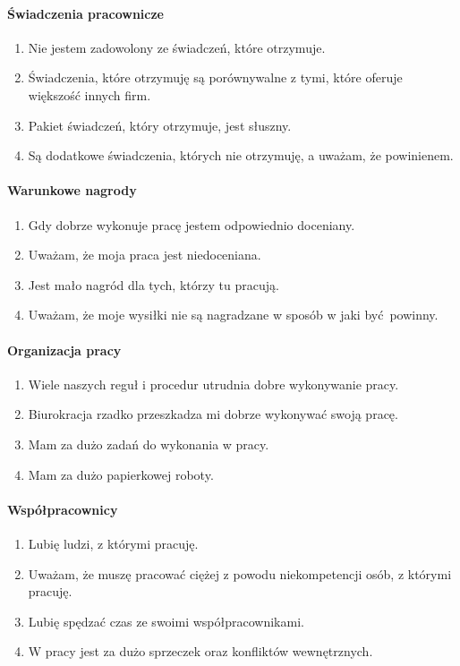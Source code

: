 \paragraph{Świadczenia pracownicze}
\begin{enumerate}
  \item Nie jestem zadowolony ze świadczeń, które otrzymuje.
  \item Świadczenia, które otrzymuję są porównywalne z tymi, które oferuje większość innych firm.
  \item Pakiet świadczeń, który otrzymuje, jest słuszny.
  \item Są dodatkowe świadczenia, których nie otrzymuję, a uważam, że powinienem.
\end{enumerate}

\paragraph{Warunkowe nagrody}
\begin{enumerate}
  \item Gdy dobrze wykonuje pracę jestem odpowiednio doceniany.
  \item Uważam, że moja praca jest niedoceniana.
  \item Jest mało nagród dla tych, którzy tu pracują.
  \item Uważam, że moje wysiłki nie są nagradzane w sposób w jaki być powinny.
\end{enumerate}

\paragraph{Organizacja pracy}
\begin{enumerate}
  \item Wiele naszych reguł i procedur utrudnia dobre wykonywanie pracy.
  \item Biurokracja rzadko przeszkadza mi dobrze wykonywać swoją pracę.
  \item Mam za dużo zadań do wykonania w pracy.
  \item Mam za dużo papierkowej roboty.
\end{enumerate}

\paragraph{Współpracownicy}
\begin{enumerate}
  \item Lubię ludzi, z którymi pracuję.
  \item Uważam, że muszę pracować ciężej z powodu niekompetencji osób, z którymi pracuję.
  \item Lubię spędzać czas ze swoimi współpracownikami.
  \item W pracy jest za dużo sprzeczek oraz konfliktów wewnętrznych.
\end{enumerate}

